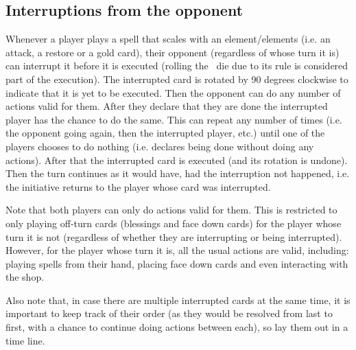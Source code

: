 \documentclass[dvipsnames,parskip,a4paper]{scrartcl}
\begin{document}
\subsection*{Interruptions from the opponent}

Whenever a player plays a spell that scales with an element/elements (i.e. an attack, a restore or a gold card), their opponent (regardless of whose turn it is) can interrupt it before it is executed (rolling the \chance \ die due to its rule is considered part of the execution). The interrupted card is rotated by 90 degrees clockwise to indicate that it is yet to be executed. Then the opponent can do any number of actions valid for them. After they declare that they are done the interrupted player has the chance to do the same. This can repeat any number of times (i.e. the opponent going again, then the interrupted player, etc.) until one of the players chooses to do nothing (i.e. declares being done without doing any actions). After that the interrupted card is executed (and its rotation is undone). Then the turn continues as it would have, had the interruption not happened, i.e. the initiative returns to the player whose card was interrupted.

\vspace{4pt}

Note that both players can only do actions valid for them. This is restricted to only playing off-turn cards (blessings and face down cards) for the player whose turn it is not (regardless of whether they are interrupting or being interrupted). However, for the player whose turn it is, all the usual actions are valid, including: playing spells from their hand, placing face down cards and even interacting with the shop.

\vspace{4pt}

Also note that, in case there are multiple interrupted cards at the same time, it is important to keep track of their order (as they would be resolved from last to first, with a chance to continue doing actions between each), so lay them out in a time line.

\vspace{4pt}
\end{document}
